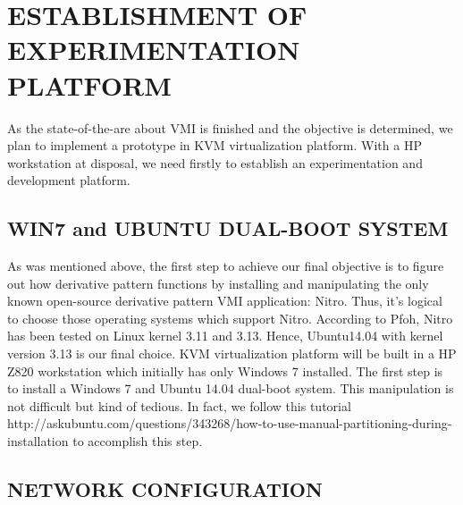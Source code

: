 
\chapter{ESTABLISHMENT OF EXPERIMENTATION PLATFORM} %

\label{Chapter5} %


As the state-of-the-are about VMI is finished and the objective is determined, we plan to implement a prototype in
KVM virtualization platform. With a HP workstation at disposal, we need firstly to establish an experimentation and
development platform.


\section{WIN7 and UBUNTU DUAL-BOOT SYSTEM}

As was mentioned above, the first step to achieve our final objective is to figure out how derivative pattern functions by
installing and manipulating the only known open-source derivative pattern VMI application: Nitro. Thus, it’s logical to
choose those operating systems which support Nitro. According to Pfoh, Nitro has been tested on Linux kernel 3.11 and
3.13. Hence, Ubuntu14.04 with kernel version 3.13 is our final choice.
KVM virtualization platform will be built in a HP Z820 workstation which initially has only Windows 7 installed. The
first step is to install a Windows 7 and Ubuntu 14.04 dual-boot system. This manipulation is not difficult but kind of
tedious. In fact, we follow this tutorial http://askubuntu.com/questions/343268/how-to-use-manual-partitioning-during-
installation to accomplish this step.


\section{NETWORK CONFIGURATION}


